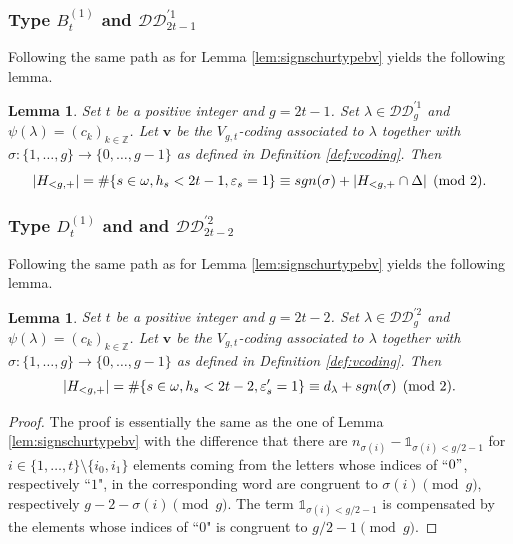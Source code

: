 \documentclass[11pt,letterpaper]{amsart}
\def\bbbz{\mathbb Z}
\def\ccdd{\mathcal {DD}}
\def\sgn{{\rm sgn}}
\newtheorem{lm}[df]{Lemma}
\numberwithin{equation}{section}
\numberwithin{df}{section}
\begin{document}
\subsubsection{Type $B^{(1)}_{t}$ and $\ccdd_{2t-1}^{'1}$}

Following the same path as for Lemma \ref{lem:signschurtypebv} yields the following lemma.
\begin{lm}\label{lem:signschurtypeb}
Set $t$ be a positive integer and $g=2t-1$.
Set $\lambda\in\ccdd_{g}^{'1}$ and $\psi(\lambda)=(c_k)_{k\in\bbbz}$.
Let $\mathbf{v}$ be the $V_{g,t}$-coding associated to $\lambda$ together with $\sigma : \lbrace 1,\dots,g\rbrace\rightarrow \lbrace 0,\dots,g-1\rbrace$ as defined in Definition \ref{def:vcoding}. Then
\begin{equation}
\lvert H_{<g,+}\rvert=\#\lbrace s\in\omega, h_s<2t-1, \varepsilon_s=1\rbrace\equiv \sgn(\sigma)+\lvert H_{<g,+}\cap \Delta\rvert\pmod{2}.
\end{equation}
\end{lm}


\subsubsection{Type $D^{(1)}_{t}$ and and $\ccdd_{2t-2}^{'2}$}

Following the same path as for Lemma \ref{lem:signschurtypebv} yields the following lemma.
\begin{lm}\label{lem:signschurtyped}
Set $t$ be a positive integer and $g=2t-2$.
Set $\lambda\in\ccdd_{g}^{'2}$ and $\psi(\lambda)=(c_k)_{k\in\bbbz}$. Let $\mathbf{v}$ be the $V_{g,t}$-coding associated to $\lambda$ together with $\sigma : \lbrace 1,\dots,g\rbrace\rightarrow \lbrace 0,\dots,g-1\rbrace$ as defined in Definition \ref{def:vcoding}. Then
\begin{equation}
\lvert H_{<g,+}\rvert=\#\lbrace s\in\omega, h_s<2t-2, \varepsilon'_s=1\rbrace\equiv d_\lambda+\sgn(\sigma)\pmod{2}.
\end{equation}
\end{lm}

\begin{proof}
The proof is essentially the same as the one of Lemma \ref{lem:signschurtypebv} with the difference that there are $n_{\sigma(i)}-\mathds{1}_{\sigma(i)<g/2-1}$ for $i\in\lbrace
1,\dots,t\rbrace \setminus \lbrace i_0,i_1\rbrace$  elements coming from the letters whose indices of ``$0"$, respectively ``$1$", in the corresponding word are congruent to $\sigma(i)\pmod{g}$, respectively $g-2-\sigma(i)\pmod{g}$. The term $\mathds{1}_{\sigma(i)<g/2-1}$ is compensated by the elements whose indices of ``$0$" is congruent to $g/2-1\pmod{g}$.
\end{proof}
\end{document}
